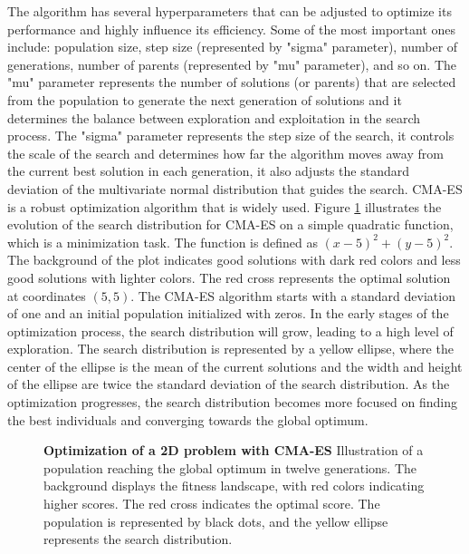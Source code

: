 The algorithm has several hyperparameters that can be adjusted to optimize its performance and highly influence its efficiency. Some of the most important ones include: population size, step size (represented by "sigma" parameter), number of generations, number of parents (represented by "mu" parameter), and so on. The "mu" parameter represents the number of solutions (or parents) that are selected from the population to generate the next generation of solutions and it determines the balance between exploration and exploitation in the search process. The "sigma" parameter represents the step size of the search, it controls the scale of the search and determines how far the algorithm moves away from the current best solution in each generation, it also adjusts the standard deviation of the multivariate normal distribution that guides the search. CMA-ES is a robust optimization algorithm that is widely used. Figure \ref{fig:cma_es} illustrates the evolution of the search distribution for CMA-ES on a simple quadratic function, which is a minimization task. The function is defined as $(x - 5) ^ 2 + (y - 5) ^ 2$. The background of the plot indicates good solutions with dark red colors and less good solutions with lighter colors. The red cross represents the optimal solution at coordinates $(5,5)$. The CMA-ES algorithm starts with a standard deviation of one and an initial population initialized with zeros. In the early stages of the optimization process, the search distribution will grow, leading to a high level of exploration. The search distribution is represented by a yellow ellipse, where the center of the ellipse is the mean of the current solutions and the width and height of the ellipse are twice the standard deviation of the search distribution. As the optimization progresses, the search distribution becomes more focused on finding the best individuals and converging towards the global optimum.

\begin{figure}[!ht]
\centering
{}
\caption[Optimization of a 2D problem with CMA-ES]{
  \textbf{Optimization of a 2D problem with CMA-ES}
  Illustration of a population reaching the global optimum in twelve generations. The background displays the fitness landscape, with red colors indicating higher scores. The red cross indicates the optimal score. The population is represented by black dots, and the yellow ellipse represents the search distribution.
 }
\label{fig:cma_es}
\end{figure}

